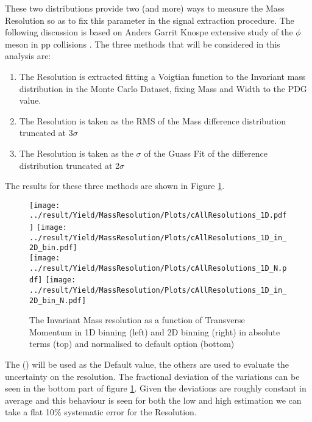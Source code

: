 \indent These two distributions provide two (and more) ways to measure the Mass Resolution so as to fix this parameter in the signal extraction procedure. The following discussion is based on Anders Garrit Knospe extensive study of the $\phi$ meson in pp collisions \cite{Anders}. The three methods that will be considered in this analysis are:
\begin{enumerate}
\item[\texttt{\color{blue}{$\sigma_{h}$}}] The Resolution is extracted fitting a Voigtian function to the Invariant mass distribution in the Monte Carlo Dataset, fixing Mass and Width to the PDG value.
\item[\texttt{\color{blue}{$\sigma_{c}$}}] The Resolution is taken as the RMS of the Mass difference distribution truncated at 3$\sigma$
\item[\texttt{\color{blue}{$\sigma_{l}$}}] The Resolution is taken as the $\sigma$ of the Guass Fit of the difference distribution truncated at 2$\sigma$
\end{enumerate}
The results for these three methods are shown in Figure \ref{fig:MassRes}.
\begin{figure}[!h]
\centering
\texttt{[image: ../result/Yield/MassResolution/Plots/cAllResolutions\_1D.pdf]}
\texttt{[image: ../result/Yield/MassResolution/Plots/cAllResolutions\_1D\_in\_2D\_bin.pdf]}\\
\texttt{[image: ../result/Yield/MassResolution/Plots/cAllResolutions\_1D\_N.pdf]}
\texttt{[image: ../result/Yield/MassResolution/Plots/cAllResolutions\_1D\_in\_2D\_bin\_N.pdf]}
\label{fig:MassRes}
\caption{The Invariant Mass resolution as a function of Transverse Momentum in 1D binning (left) and 2D binning (right) in absolute terms (top) and normalised to default option (bottom) \texttt{} }
\end{figure}
The (\texttt{}) will be used as the Default value, the others are used to evaluate the uncertainty on the resolution. The fractional deviation of the variations can be seen in the bottom part of figure \ref{fig:MassRes}. Given the deviations are roughly constant in average and this behaviour is seen for both the low and high estimation we can take a flat 10\% systematic error for the Resolution.